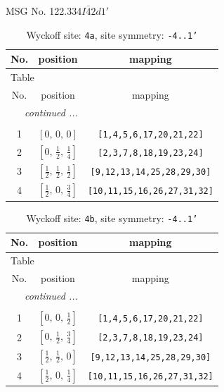 \documentclass[fleqn,8pt]{jsarticle}
\begin{document}
\setcounter{MaxMatrixCols}{32}

\renewcommand{\tablename}{Table~}
\renewcommand{\figurename}{Figure~}
\begin{center}
\LARGE
MSG No. 122.334\quad$I\bar{4}2d1'$
\end{center}
\renewcommand{\arraystretch}{1.2}
\begin{longtable}{ccc}
\caption{Wyckoff site: {\tt 4a}, site symmetry: {\tt -4..1'}}
 \\
 \hline \hline
No. & position & mapping \\ \hline \endfirsthead

\multicolumn{2}{l}{\tablename\ \thetable{}} \\
 \hline \hline
No. & position & mapping \\ \hline \endhead

 \hline \hline
\multicolumn{2}{r}{\footnotesize\it continued ...} \\ \endfoot

 \hline \hline
\multicolumn{2}{r}{} \\ \endlastfoot

1 & $\left[ 0,\, 0,\, 0 \right]$ & {\tt [1,4,5,6,17,20,21,22]} \\ \hline
2 & $\left[ 0,\, \frac{1}{2},\, \frac{1}{4} \right]$ & {\tt [2,3,7,8,18,19,23,24]} \\ \hline
3 & $\left[ \frac{1}{2},\, \frac{1}{2},\, \frac{1}{2} \right]$ & {\tt [9,12,13,14,25,28,29,30]} \\ \hline
4 & $\left[ \frac{1}{2},\, 0,\, \frac{3}{4} \right]$ & {\tt [10,11,15,16,26,27,31,32]} \\
\end{longtable}
\renewcommand{\arraystretch}{1.2}
\begin{longtable}{ccc}
\caption{Wyckoff site: {\tt 4b}, site symmetry: {\tt -4..1'}}
 \\
 \hline \hline
No. & position & mapping \\ \hline \endfirsthead

\multicolumn{2}{l}{\tablename\ \thetable{}} \\
 \hline \hline
No. & position & mapping \\ \hline \endhead

 \hline \hline
\multicolumn{2}{r}{\footnotesize\it continued ...} \\ \endfoot

 \hline \hline
\multicolumn{2}{r}{} \\ \endlastfoot

1 & $\left[ 0,\, 0,\, \frac{1}{2} \right]$ & {\tt [1,4,5,6,17,20,21,22]} \\ \hline
2 & $\left[ 0,\, \frac{1}{2},\, \frac{3}{4} \right]$ & {\tt [2,3,7,8,18,19,23,24]} \\ \hline
3 & $\left[ \frac{1}{2},\, \frac{1}{2},\, 0 \right]$ & {\tt [9,12,13,14,25,28,29,30]} \\ \hline
4 & $\left[ \frac{1}{2},\, 0,\, \frac{1}{4} \right]$ & {\tt [10,11,15,16,26,27,31,32]} \\
\end{longtable}
\end{document}
